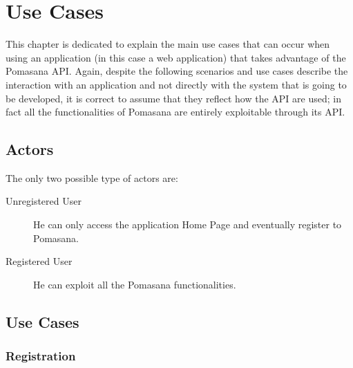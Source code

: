 


\chapter{Use Cases}

This chapter is dedicated to explain the main use cases that can occur when using an application (in this case a web application) that takes advantage of the Pomasana API. Again, despite the following scenarios and use cases describe the interaction with an application and not directly with the system that is going to be developed, it is correct to assume that they reflect how the API are used; in fact all the functionalities of Pomasana are entirely exploitable through its API.

	\section{Actors}
	The only two possible type of actors are:
		
		\begin{description}

			\item[Unregistered User] He can only access the application Home Page and eventually register to Pomasana.

			\item[Registered User] He can exploit all the Pomasana functionalities.

		\end{description}

	\section{Use Cases}

		\subsection{Registration}

